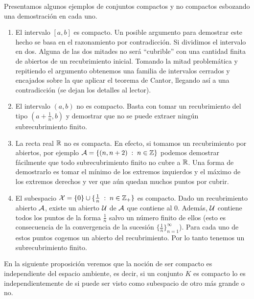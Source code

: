 \begin{exa} Presentamos algunos ejemplos de conjuntos compactos y no compactos esbozando una demostración en cada uno.
	\begin{enumerate}
		\item El intervalo $[a,b]$ es compacto. Un posible argumento para demostrar este hecho se basa en el razonamiento por contradicción. Si dividimos el intervalo en dos. Alguna de las dos mitades no será ``cubrible'' con una cantidad finita de abiertos de un recubrimiento inicial. Tomando la mitad problemática y repitiendo el argumento obtenemos una familia de intervalos cerrados y encajados sobre la que aplicar el teorema de Cantor, llegando así a una contradicción (se dejan los detalles al lector). 
		\item El intervalo $(a,b)$ no es compacto. Basta con tomar un recubrimiento del tipo $(a+\frac{1}{n},b)$ y demostrar que no se puede extraer ningún subrecubrimiento finito.
		\item La recta real $\mathbb{R}$ no es compacta. En efecto, si tomamos un recubrimiento por abiertos, por ejemplo $\mathcal{A}=\{(n,n+2) \;:\; n \in \mathbb{Z}\}$ podemos demostrar fácilmente que todo subrecubrimiento finito no cubre a $\mathbb{R}$. Una forma de demostrarlo es tomar el mínimo de los extremos izquierdos y el máximo de los extremos derechos y ver que aún quedan muchos puntos por cubrir.
		\item El subespacio $\mathcal{X} = \{0\} \cup \{\frac{1}{n} \;:\; n \in \mathbb{Z}_{+}\}$ es compacto.
		Dado un recubrimiento abierto $\mathcal{A}$, existe un abierto $\mathcal{U}$ de $\mathcal{A}$ que contiene al $0$. Además, $\mathcal{U}$ contiene todos los puntos de la forma $\frac{1}{n}$ salvo un número finito de ellos (esto es consecuencia de la convergencia de la sucesión $\{\frac{1}{n}\}_{n=1}^\infty$). Para cada uno de estos puntos cogemos un abierto del recubrimiento. Por lo tanto tenemos un subrecubrimiento finito. \qedhere
	\end{enumerate}
\end{exa}
En la siguiente proposición veremos que la noción de ser compacto es independiente del espacio ambiente, es decir, si un conjunto $K$ es compacto lo es independientemente de si puede ser visto como subespacio de otro más grande o no.

